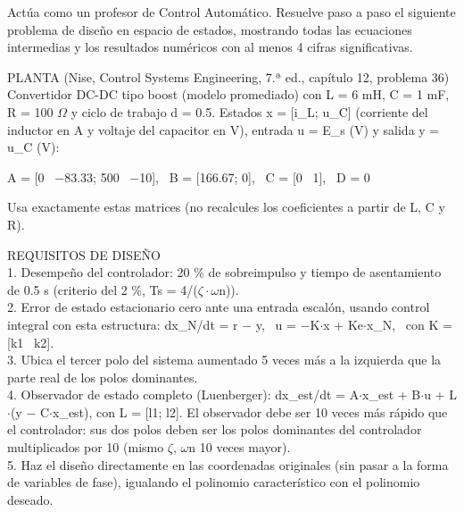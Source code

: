 \documentclass[conference,a4paper]{IEEEtran}
\begin{document}
\begin{framed}
\small
\noindent Actúa como un profesor de Control Automático. Resuelve paso a paso el siguiente problema de diseño en espacio de estados, mostrando todas las ecuaciones intermedias y los resultados numéricos con al menos 4 cifras significativas.

\smallskip\noindent PLANTA (Nise, Control Systems Engineering, 7.ª ed., capítulo 12, problema 36)\\
Convertidor DC-DC tipo boost (modelo promediado) con L = 6 mH, C = 1 mF, R = 100 $\Omega$ y ciclo de trabajo d = 0.5. Estados x = [i\_L; u\_C] (corriente del inductor en A y voltaje del capacitor en V), entrada u = E\_s (V) y salida y = u\_C (V):

\smallskip\noindent A = [0 \ $-$83.33; 500 \ $-$10], \ B = [166.67; 0], \ C = [0 \ 1], \ D = 0

\smallskip\noindent Usa exactamente estas matrices (no recalcules los coeficientes a partir de L, C y R).

\smallskip\noindent REQUISITOS DE DISEÑO\\
1. Desempeño del controlador: 20 \% de sobreimpulso y tiempo de asentamiento de 0.5 s (criterio del 2 \%, Ts = 4/($\zeta\cdot\omega$n)).\\
2. Error de estado estacionario cero ante una entrada escalón, usando control integral con esta estructura: dx\_N/dt = r $-$ y, \ u = $-$K$\cdot$x + Ke$\cdot$x\_N, \ con K = [k1 \ k2].\\
3. Ubica el tercer polo del sistema aumentado 5 veces más a la izquierda que la parte real de los polos dominantes.\\
4. Observador de estado completo (Luenberger): dx\_est/dt = A$\cdot$x\_est + B$\cdot$u + L$\cdot$(y $-$ C$\cdot$x\_est), con L = [l1; l2]. El observador debe ser 10 veces más rápido que el controlador: sus dos polos deben ser los polos dominantes del controlador multiplicados por 10 (mismo $\zeta$, $\omega$n 10 veces mayor).\\
5. Haz el diseño directamente en las coordenadas originales (sin pasar a la forma de variables de fase), igualando el polinomio característico con el polinomio deseado.


\end{framed}
\end{document}

